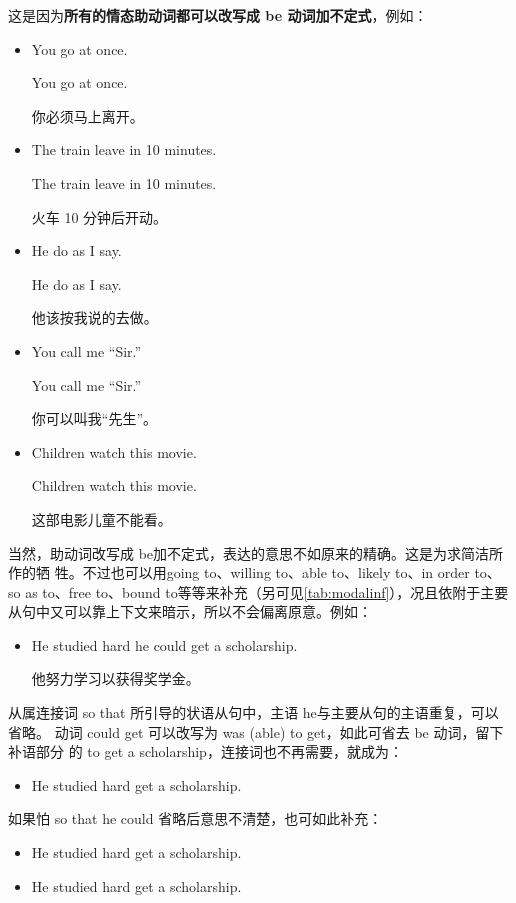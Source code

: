 这是因为\textbf{所有的情态助动词都可以改写成 be 动词加不定式}，例如：
\begin{itemize}
\item   You  go at once.

  \reitem You  go at once.

  你必须马上离开。
\item The train  leave in 10 minutes.

\reitem The train  leave in 10 minutes.

火车 10 分钟后开动。

\item   He  do as I say.

  \reitem He  do as I say.

  他该按我说的去做。

\item   You  call me “Sir.”

  \reitem You  call me “Sir.”

  你可以叫我“先生”。

\item Children  watch this movie.

  \reitem Children  watch this movie.

  这部电影儿童不能看。
\end{itemize}

当然，助动词改写成 be加不定式，表达的意思不如原来的精确。这是为求简洁所作的牺
牲。不过也可以用going to、willing to、able to、likely to、in order to、so as
to、free to、bound to等等来补充（另可见\cref{tab:modalinf}），况且依附于主要
从句中又可以靠上下文来暗示，所以不会偏离原意。例如：

\begin{itemize}
\item He studied hard  he could get a scholarship.

  他努力学习以获得奖学金。
\end{itemize}
从属连接词 so that 所引导的状语从句中，主语 he与主要从句的主语重复，可以省略。
动词 could get 可以改写为 was (able) to get，如此可省去 be 动词，留下补语部分
的 to get a scholarship，连接词也不再需要，就成为：
\begin{itemize}
\item He studied hard  get a scholarship.
\end{itemize}
如果怕 so that he could 省略后意思不清楚，也可如此补充：
\begin{itemize}
\item   He studied hard  get a scholarship.
\item   He studied hard  get a scholarship.
\end{itemize}

